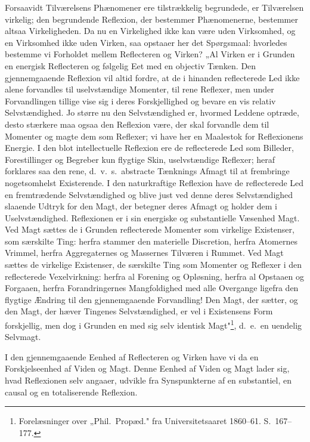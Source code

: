 \documentclass[12pt]{book}
\newcommand{\opage}[1]{\marginnote{\footnotesize\textit{[#1]}}}
\begin{document}
Forsaavidt Tilværelsens Phænomener ere tilstrækkelig begrundede, er Tilværelsen
virkelig; den begrundende Reflexion, der bestemmer Phænomenerne, bestemmer altsaa
Virkeligheden. Da nu en Virkelighed ikke kan være uden Virksomhed, og en Virksomhed
ikke uden Virken, saa opstaaer her det Spørgsmaal: hvorledes bestemme vi Forholdet
mellem Reflecteren og Virken? „Al Virken er i Grunden en energisk Reflecteren og
følgelig Eet med en objectiv Tænken. Den gjennemgaaende Reflexion vil altid fordre, at
de i hinanden reflecterede Led ikke alene forvandles til uselvstændige Momenter, til
rene Reflexer, men under Forvandlingen tillige vise sig i deres Forskjellighed og
bevare en vis relativ Selvstændighed. Jo større nu den Selvstændighed er, hvormed
Leddene optræde, desto stærkere maa ogsaa den Reflexion være, der skal forvandle dem
til Momenter og magte dem som Reflexer; vi have her en Maalestok for Reflexionens
Energie. I den blot intellectuelle Reflexion ere de reflecterede Led som Billeder,
Forestillinger og Begreber kun flygtige Skin, uselvstændige Reflexer; heraf forklares
saa den rene, d.\ v.\ s.\ abstracte Tænknings Afmagt til at frembringe nogetsomhelst
Existerende. I den naturkraftige Reflexion have de reflecterede Led en fremtrædende
Selvstændighed og blive just ved denne deres Selvstændighed slaaende Udtryk for den
Magt, der betegner deres Afmagt og holder dem i Uselvstændighed. Reflexionen er i sin
energiske og substantielle Væsenhed Magt. Ved Magt sættes de i Grunden reflecterede
Momenter som virkelige Existenser, som særskilte Ting: herfra stammer den materielle
Discretion, herfra Atomernes Vrimmel, herfra Aggregaternes og Massernes Tilværen i
Rummet. Ved Magt sættes de virkelige Existenser,
\opage{106} de særskilte Ting som Momenter og Reflexer i den reflecterede Vexelvirkning: herfra al
Forening og Opløsning, herfra al Opstaaen og Forgaaen, herfra Forandringernes
Mangfoldighed med alle Overgange ligefra den flygtige Ændring til den gjennemgaaende
Forvandling! Den Magt, der sætter, og den Magt, der hæver Tingenes Selvstændighed, er
vel i Existensens Form forskjellig, men dog i Grunden en med sig selv identisk
Magt"\footnote{Forelæsninger over „Phil.\ Propæd." fra Universitetsaaret 1860--61.
S.~167--177.}, d.\ e.\ en uendelig Selvmagt.

I den gjennemgaaende Eenhed af Reflecteren og Virken have vi da en Forskjelseenhed af
Viden og Magt. Denne Eenhed af Viden og Magt lader sig, hvad Reflexionen selv angaaer,
udvikle fra Synspunkterne af en substantiel, en causal og en totaliserende Reflexion.
\end{document}
